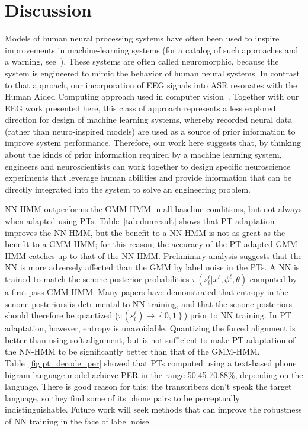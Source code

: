 \section{Discussion}

Models of human neural processing systems have often been used to
inspire improvements in machine-learning systems (for a catalog of
such approaches and a warning, see~\cite{Bourlard96}).  These systems
are often called neuromorphic, because the system is engineered to
mimic the behavior of human neural systems. In contrast to that
approach, our incorporation of EEG signals into ASR resonates with the
Human Aided Computing approach used in computer
vision~\cite{Shenoy08,Wang09}. Together with our EEG work presented
here, this class of approach represents a less explored direction for
design of machine learning systems, whereby recorded neural data
(rather than neuro-inspired models) are used as a source of prior
information to improve system performance. Therefore, our work here
suggests that, by thinking about the kinds of prior information
required by a machine learning system, engineers and neuroscientists
can work together to design specific neuroscience experiments that
leverage human abilities and provide information that can be directly
integrated into the system to solve an engineering problem.

NN-HMM outperforms the GMM-HMM in all baseline conditions, but not
always when adapted using PTs. {\color{blue} Table~\ref{tab:dnnresult}
  shows that PT adaptation improves the NN-HMM, but the benefit to a
  NN-HMM is not as great as the benefit to a GMM-HMM; for this reason,
  the accuracy of the PT-adapted GMM-HMM catches up to that of the
  NN-HMM.}  Preliminary analysis suggests that the NN is more
adversely affected than the GMM by label noise in the PTs.  A NN is
trained to match the senone posterior probabilities
$\pi(s_t^\ell|x^\ell,\phi^\ell,\theta)$ computed by a first-pass
GMM-HMM.  Many papers have demonstrated that entropy in the senone
posteriors is detrimental to NN training, and that the senone
posteriors should therefore be quantized
($\pi(s_t^\ell)\rightarrow\left\{0,1\right\}$) prior to NN training.
In PT adaptation, however, entropy is unavoidable.
{\color{blue} Quantizing the
  forced alignment is better than using soft alignment, but
  is not sufficient to make PT adaptation of the NN-HMM to be
  significantly better than that of the GMM-HMM.
  Table~\ref{fig:pt_decode_per} showed that PTs computed using
  a text-based phone bigram language model achieve PER in the range
  50.45-70.88\%, depending on the language.}
There is good reason for this: the transcribers don't speak the target
language, so they find some of its phone pairs to be perceptually
indistinguishable.  Future work will seek methods that can improve the
robustness of NN training in the face of label noise.


